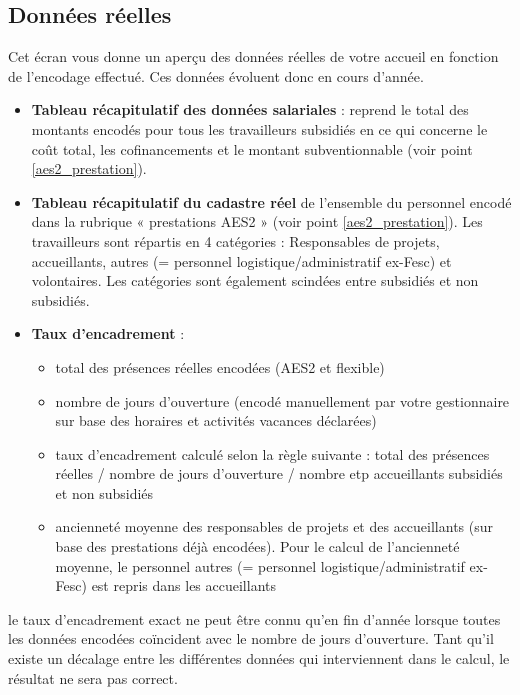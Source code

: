 \subsection{Données réelles}\label{aes2_données_réelles}
Cet écran vous donne un aperçu des données réelles de votre accueil en fonction de l’encodage effectué. Ces données évoluent donc en cours d’année.


\begin{itemize}
    \item \textbf{Tableau récapitulatif des données salariales} : reprend le total des montants encodés pour tous les travailleurs subsidiés en ce qui concerne le coût total, les cofinancements et le montant subventionnable (voir point \ref{aes2_prestation}).
    \item \textbf{Tableau récapitulatif du cadastre réel} de l’ensemble du personnel encodé dans la rubrique « prestations AES2 » (voir point \ref{aes2_prestation}). Les travailleurs sont répartis en 4 catégories : Responsables de projets, accueillants, autres (= personnel logistique/administratif ex-Fesc) et volontaires. Les catégories sont également scindées entre subsidiés et non subsidiés.
    \item \textbf{Taux d’encadrement} : 
        \begin{itemize}
            \item total des présences réelles encodées (AES2 et flexible)
            \item nombre de jours d’ouverture (encodé manuellement par votre gestionnaire sur base des horaires et activités vacances déclarées)
            \item taux d’encadrement calculé selon la règle suivante : total des présences réelles / nombre de jours d’ouverture / nombre etp accueillants subsidiés et non subsidiés
            \item ancienneté moyenne des responsables de projets et des accueillants (sur base des prestations déjà encodées). Pour le calcul de l’ancienneté moyenne, le personnel autres (= personnel logistique/administratif ex-Fesc) est repris dans les accueillants
        \end{itemize}

\end{itemize}

\begin{remarque}le taux d’encadrement exact ne peut être connu qu’en fin d’année lorsque toutes les données encodées coïncident avec le nombre de jours d’ouverture. Tant qu’il existe un décalage entre les différentes données qui interviennent dans le calcul, le résultat ne sera pas correct.
\end{remarque}


